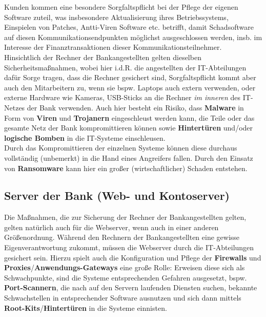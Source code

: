 Kunden kommen eine besondere Sorgfaltspflicht bei der Pflege der eigenen Software zuteil, was insbesondere Aktualisierung ihres Betriebssystems, Einspielen von Patches, Antti-Viren Software {etc.} betrifft, damit Schadsoftware auf diesen Kommunikationsendpunkten möglichst ausgeschlossen werden, {insb.} im Interesse der Finanztransaktionen dieser Kommunikationsteilnehmer.\\
Hinsichtlich der Rechner der Bankangestellten gelten dieselben Sicherheitsmaßnahmen, wobei hier i.d.R. die angestellten der IT-Abteilungen dafür Sorge tragen, dass die Rechner gesichert sind, Sorgfaltspflicht kommt aber auch den Mitarbeitern zu, wenn sie {bspw.} Laptops auch extern verwenden, oder externe Hardware wie Kameras, USB-Sticks an die Rechner \textit{im inneren} des IT-Netzes der Bank verwenden.
Auch hier besteht ein Risiko, dass \textbf{Malware} in Form von \textbf{Viren} und \textbf{Trojanern} eingeschleust werden kann, die Teile oder das gesamte Netz der Bank kompromittieren können sowie \textbf{Hintertüren} und/oder \textbf{logische Bomben} in die IT-Systeme einschleusen.\\
Durch das Kompromittieren der einzelnen Systeme können diese durchaus vollständig (unbemerkt) in die Hand eines Angreifers fallen.
Durch den Einsatz von \textbf{Ransomware} kann hier ein großer (wirtschaftlicher) Schaden entstehen.

\subsection{Server der Bank (Web- und Kontoserver)}
Die Maßnahmen, die zur Sicherung der Rechner der Bankangestellten gelten, gelten natürlich auch für die Webserver, wenn auch in einer anderen Größenordnung. Während den Rechnern der Bankangestellten eine gewisse Eigenverantwortung zukommt, müssen die Webserver durch die IT-Abteilungen gesichert sein. Hierzu spielt auch die Konfiguration und Pflege der \textbf{Firewalls} und \textbf{Proxies}/\textbf{Anwendungs-Gateways} eine große Rolle: Erweisen diese sich als Schwachpunkte, sind die Systeme entsprechenden Gefahren ausgesetzt, bspw. \textbf{Port-Scannern}, die nach auf den Servern laufenden Diensten suchen, bekannte Schwachstellen in entsprechender Software ausnutzen und sich dann mittels \textbf{Root-Kits}/\textbf{Hintertüren} in die Systeme einnisten.

